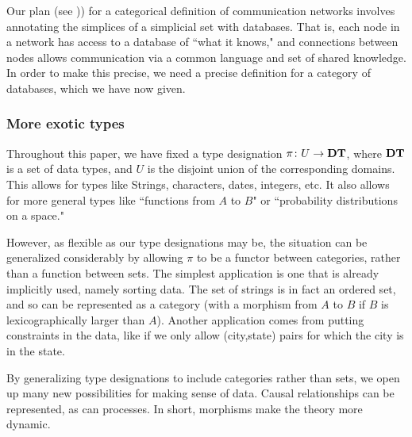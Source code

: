 \documentclass{amsart}
\def\DT{{\bf DT}}
\begin{document}
Our plan (see \cite{Spi2})) for a categorical definition of communication networks involves annotating the simplices of a simplicial set with databases.  That is, each node in a network has access to a database of ``what it knows," and connections between nodes allows communication via a common language and set of shared knowledge.  In order to make this precise, we need a precise definition for a category of databases, which we have now given.  

\subsubsection{More exotic types}\label{subsubsec:types}

Throughout this paper, we have fixed a type designation $\pi\taking U\to\DT$, where $\DT$ is a set of data types, and $U$ is the disjoint union of the corresponding domains.  This allows for types like Strings, characters, dates, integers, etc.  It also allows for more general types like ``functions from $A$ to $B$" or ``probability distributions on a space."  

However, as flexible as our type designations may be, the situation can be generalized considerably by allowing $\pi$ to be a functor between categories, rather than a function between sets.  The simplest application is one that is already implicitly used, namely sorting data.  The set of strings is in fact an ordered set, and so can be represented as a category (with a morphism from $A$ to $B$ if $B$ is lexicographically larger than $A$).  Another application comes from putting constraints in the data, like if we only allow (city,state) pairs for which the city is in the state. 

By generalizing type designations to include categories rather than sets, we open up many new possibilities for making sense of data.  Causal relationships can be represented, as can processes.  In short, morphisms make the theory more dynamic.  
\end{document}
